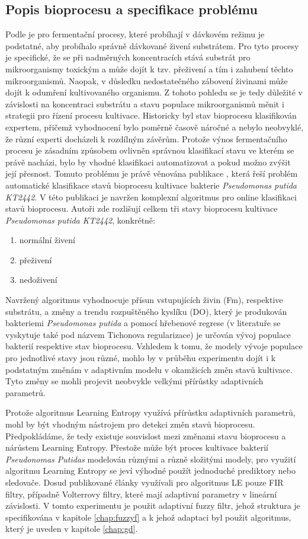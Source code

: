 \subsection{Popis bioprocesu a specifikace problému}
Podle \cite{fermentace} je pro fermentační procesy, které probíhají v dávkovém režimu je podstatné, aby probíhalo správně dávkované živení substrátem. Pro tyto procesy je specifické, že se při nadměrných koncentracích stává substrát pro mikroorganismy toxickým a může dojít k tzv. přeživení a tím i zahubení těchto mikroorganismů. Naopak, v důsledku nedostatečného zábovení živinami může dojít k odumření kultivovaného organismu. Z tohoto pohledu se je tedy důležité v závislosti na koncentraci substrátu a stavu populace mikroorganismů měnit i strategii pro řízení procesu kultivace. Historicky byl stav bioprocesu klasifikován expertem, přičemž vyhodnocení bylo poměrně časově náročné a nebylo neobvyklé, že různí experti docházeli k rozdílným závěrům. Protože výnos fermentačního procesu je zásadním způsobem ovlivněn správnou klasifikací stavu ve kterém se právě nacházi, bylo by vhodné klasifikaci automatizovat a pokud možno zvýšit její přesnost. Tomuto problému je právě věnována publikace \cite{fermentace}, která řeší problém automatické klasifikace stavů bioprocesu kultivace bakterie \textit{Pseudomonas putida KT2442}. V této publikaci je navržen komplexní algoritmus pro online klasifikaci stavů bioprocesu. Autoři zde rozlišují celkem tři stavy bioprocesu kultivace \textit{Pseudomonas putida KT2442}, konkrétně:
\begin{enumerate}
    \item normální živení
    \item přeživení
    \item nedoživení
\end{enumerate}
Navržený algoritmus vyhodnocuje přísun vstupujících živin (Fm), respektive substrátu, a změny a trendu rozpuštěného kyslíku (DO), který je produkován bakteriemi \textit{Pseudomonas putida} a pomocí hřebenové regrese (v literatuře se vyskytuje také pod názvem Tichonova regularizace) je určován vývoj populace bakterií respektive stav bioprocesu. Vzhledem k tomu, že modely vývoje populace pro jednotlivé stavy jsou různé, mohlo by v průběhu experimentu dojít i k podstatným změnám v adaptivním modelu v okamžicích změn stavů kultivace. Tyto změny se mohli projevit neobvykle velkými přírůstky adaptivních parametrů. 
\par
Protože algoritmus Learning Entropy využívá přírůstku adaptivních parametrů, mohl by být vhodným nástrojem pro detekci změn stavů bioprocesu. Předpokládáme, že tedy existuje souvislost mezi změnami stavu bioprocesu a nárůstem Learning Entropy. Přestože může být proces kultivace bakterií \textit{Pseudonomas Putidas} modelován různými a různě složitými modely, pro využití algoritmu Learning Entropy se jeví výhodné použít jednoduché prediktory nebo sledovače. Dosud publikované články využívali pro algoritmus LE pouze FIR filtry, případně Volterrovy filtry, které mají adaptivní parametry v lineární závislosti. V tomto experimentu je použit adaptivní fuzzy filtr, jehož struktura je specifikována v kapitole \ref{chap:fuzzyf} a k jehož adaptaci byl použit algoritmus, který je uveden v kapitole \ref{chap:gd}.
